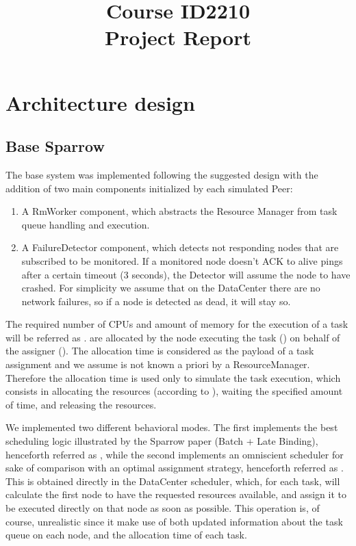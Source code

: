 \documentclass[conference]{IEEEtran}
\title{
  Course ID2210\\
  Project Report
}
\author{
  \IEEEauthorblockN{Riccardo Reale}
  \IEEEauthorblockA{Peerialism AB\\
    {riccardo.reale@peerialism.com}\\
    \url{https://github.com/riccardoreale/id2210-vt14.git}
  }
  \and
  \IEEEauthorblockN{Giovanni Simoni}
  \IEEEauthorblockA{Peerialism AB\\
    {giovanni.simoni@peerialism.com}\\
    \url{https://github.com/dacav/id2210-vt14.git}
  }
}
\begin{document}
\maketitle

\section{Architecture design}

  \subsection{Base Sparrow}
  
  The base system was implemented following the suggested design with the addition of 
  two main components initialized by each simulated Peer:
  \begin{enumerate}

  \item A RmWorker component, which abstracts the Resource Manager from task queue
  handling and execution.
  
  \item A FailureDetector component, which detects not responding nodes that are subscribed to be
  monitored. If a monitored node doesn't ACK to alive pings after a certain timeout (3 seconds), the Detector will assume the node to have crashed. For simplicity we assume that on the DataCenter there are no network failures, so if a node is detected as dead, it will stay so.
  
  \end{enumerate}
  
   The required number of CPUs and amount of memory for the execution of a
  task will be referred as \treq. \Treq are allocated by the node executing the
  task (\exc) on behalf of the assigner (\tmast). The allocation time is
  considered as the payload of a task assignment and we assume is not known a priori by a ResourceManager. Therefore the allocation time is used only to simulate the task execution, which consists in allocating the resources (according to \treq), waiting the specified amount of time, and releasing the resources.

  We implemented two different behavioral modes. The first implements
  the best scheduling logic illustrated by the Sparrow paper (Batch + Late Binding), henceforth referred as \us, while the second implements
  an omniscient scheduler for sake of comparison with an optimal assignment
  strategy, henceforth referred as \omni. This is obtained directly in the DataCenter scheduler, which, for each task, will calculate the first node to have the requested resources available, and assign it to be executed directly on that node as soon as possible. This operation is, of course, unrealistic since it make use of both updated information about the task queue on each node, and the allocation time of each task.
  
\end{document}
